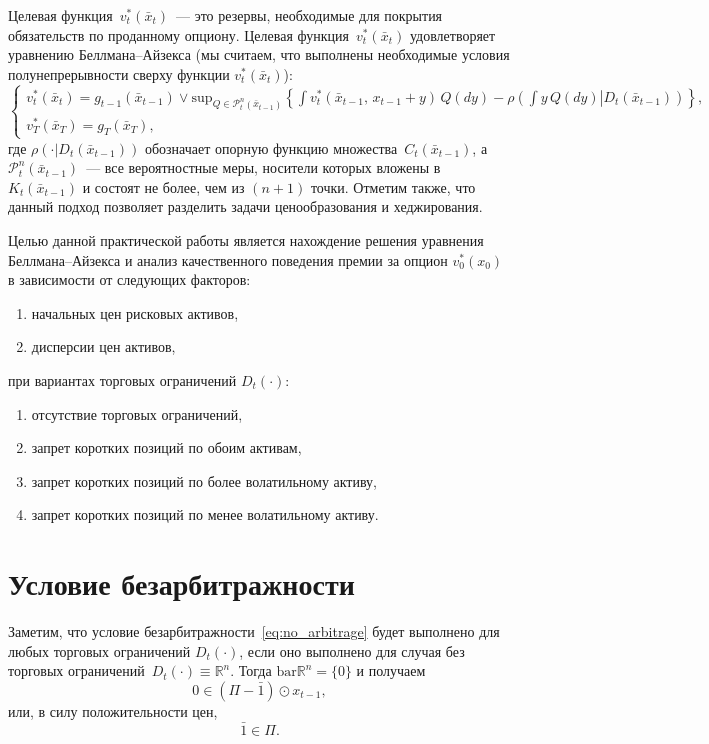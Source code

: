 \documentclass[a4paper, 12pt]{article}
\theoremstyle{def}
\theoremstyle{th}
\theoremstyle{rem}
\begin{document}
    Целевая функция~$v^*_t(\bar x_t)$~--- это резервы, необходимые для покрытия обязательств по проданному опциону. Целевая функция~$v^*_t(\bar x_t)$ удовлетворяет уравнению Беллмана--Айзекса (мы считаем, что выполнены необходимые условия полунепрерывности сверху функции $v^*_t(\bar x_t)$):
    \begin{equation} \label{eq:bellman-ajzeks}
        \begin{cases}
            v^*_t(\bar x_t) = g_{t-1}(\bar x_{t-1}) \lor \mathrm{sup}_{Q \in \mathcal{P}_t^n(\bar x_{t-1})} \left\{
                \int v_t^*(\bar x_{t-1},\, x_{t-1}+y)\,Q(dy)
                -
                \rho\left(
                    \left. \int y\,Q(dy)
                    \right|
                    D_t(\bar x_{t-1})
                \right)
            \right\}, \\
            v_T^*(\bar x_T) = g_T(\bar x_T),
        \end{cases}
    \end{equation}
    где $\rho\left(\cdot\left| D_t(\bar x_{t-1}) \right.\right)$ обозначает опорную функцию множества~$C_t(\bar x_{t-1})$, а $\mathcal{P}_t^n(\bar x_{t-1})$~--- все вероятностные меры, носители которых вложены в~$K_t(\bar x_{t-1})$ и состоят не более, чем из $(n+1)$ точки. Отметим также, что данный подход позволяет разделить задачи ценообразования и хеджирования.

    Целью данной практической работы является нахождение решения уравнения Беллмана--Айзекса и анализ качественного поведения премии за опцион $v_0^*(x_0)$ в зависимости от следующих факторов:
    \begin{enumerate}
        \item начальных цен рисковых активов,
        \item дисперсии цен активов,
    \end{enumerate}
    при вариантах торговых ограничений $D_t(\cdot)$:
    \begin{enumerate}
        \item отсутствие торговых ограничений,
        \item запрет коротких позиций по обоим активам,
        \item запрет коротких позиций по более волатильному активу,
        \item запрет коротких позиций по менее волатильному активу.
    \end{enumerate}


    \section{Условие безарбитражности}
    Заметим, что условие безарбитражности~\eqref{eq:no_arbitrage} будет выполнено для любых торговых ограничений $D_t(\cdot)$, если оно выполнено для случая без торговых ограничений~$D_t(\cdot) \equiv \mathbb{R}^n$. Тогда $\mathrm{bar}\mathbb{R}^n = \{0\}$ и получаем
    \begin{equation}
        0 \in (\Pi - \bar 1) \odot x_{t-1},
    \end{equation}
    или, в силу положительности цен,
    \begin{equation}
        \bar 1 \in \Pi.
    \end{equation}
\end{document}
